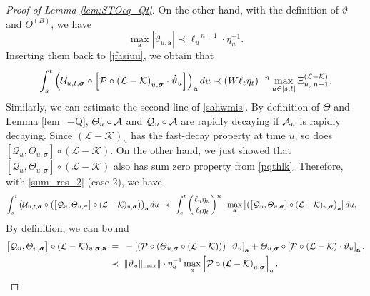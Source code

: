 \documentclass[10pt,reqno]{article}
\theoremstyle{plain} %
\theoremstyle{remark}
\numberwithin{equation}{section}
\begin{document}
\begin{proof}[Proof of Lemma \ref{lem:STOeq_Qt}]
  
 On the other hand, with the definition of $\vartheta$ and $\Theta^{(B)}$, we have 
$$
   \max_{\textbf{a}}\left| 
       \dot \vartheta_{u,\textbf{a} } \right|\prec \ell_u^{-n+1}\cdot \eta_u^{-1}.  
$$
 Inserting them back to \eqref{jfasiuu}, we obtain that
\begin{align}\label{kkuuwsaf}
  \int_{s}^t 
     \left(\mathcal{U}_{u, t, \boldsymbol{\sigma}} 
     \circ \left[ {\cal P} \circ
      \left(\mathcal{L} - \mathcal{K}\right)_{u, \boldsymbol{\sigma}}
        \cdot \dot \vartheta_{u } \right]\right)_{\textbf{a}} du  \prec (W\ell_t\eta_t)^{-n}\max_{u\in [s,t]} \Xi^{(\cal L-K)}_{u,\; n-1}. 
 \end{align}
Similarly, we can estimate the second line of \eqref{sahwmis}.  By definition of $\varTheta$ and Lemma \ref{lem_+Q},    $ {\varTheta}_u \circ {\cal A}$ and ${\cal Q}_u  \circ {\cal A}$
are rapidly decaying if ${\cal A}_u$ is rapidly decaying. Since $(\mathcal{L}-\mathcal{K})_u$ has the fast-decay property at time $u$, so does $\left[\mathcal{Q}_u, \varTheta_{u,\boldsymbol{\sigma}}\right] \circ(\mathcal{L}-\mathcal{K})$. On the other hand, we just showed that $
\left[\mathcal{Q}_u, \varTheta_{u,\boldsymbol{\sigma}}\right] \circ(\mathcal{L}-\mathcal{K})
$ also has sum zero property from \eqref{pqthlk}.  
Therefore,  with  \eqref{sum_res_2} (case 2), we have 
\begin{align}\label{jfasiuu222}
 \int_{s}^t 
   \left(\mathcal{U}_{u, t, \boldsymbol{\sigma}} 
     \circ \left( \big[{\cal Q}_u , \varTheta_{u,\boldsymbol{\sigma}} \big]\circ (\mathcal{L} - \mathcal{K}) _{u, \boldsymbol{\sigma} }\right) \right)_{\textbf{a}} du  
         \;   \prec \;&\;\int_s^t \left(\frac{\ell_u\eta_u}{\ell_t\eta_t}\right)^{n}\cdot 
          \max_{\textbf{a}} 
          \left|\left(\big[{\cal Q}_u , \varTheta_{u,\boldsymbol{\sigma}} \big]\circ (\mathcal{L} - \mathcal{K}) _{u, \boldsymbol{\sigma} }\right)_{\textbf{a}}\right|du.
\end{align}
By definition, we can bound 
\begin{align}
   \big[{\cal Q}_u , \varTheta_{u,\boldsymbol{\sigma}} \big]\circ (\mathcal{L} - \mathcal{K}) _{u, \boldsymbol{\sigma}, \textbf{a}}
   \;=\; & \; -\left[ \left({\cal P} \circ \left(\varTheta_{u, \boldsymbol{\sigma}} \circ (\mathcal{L} - \mathcal{K})\right)\right) \cdot \vartheta_u \right]_{\textbf{a}} 
    + \varTheta_{u, \boldsymbol{\sigma}} \circ \left[ {\cal P} \circ \left( \mathcal{L} - \mathcal{K} \right) \cdot \vartheta_u \right]_{\textbf{a}}.
\\\nonumber
 \;\prec \; & \;  \|\vartheta_u\|_{\max}\|\cdot \eta_u^{-1}\max_a\left[ {\cal P} \circ \left(  \mathcal{L} - \mathcal{K} \right)_{u,\boldsymbol{\sigma}} \right]_{a} .

\end{align}
\end{proof}
\end{document}
